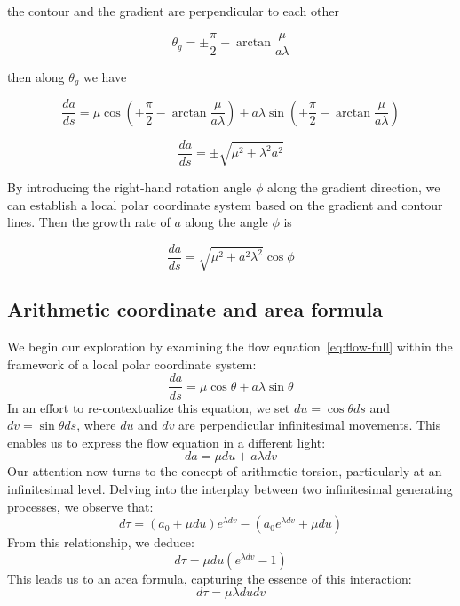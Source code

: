 \documentclass[12pt]{article}
\begin{document}
the contour and the gradient are perpendicular to each other

\begin{equation}
    \theta_g = \pm \frac{\pi}{2} - \arctan \frac{\mu}{a \lambda}\label{eq:gradientangle-full}
\end{equation}

then along $\theta_g$ we have

\begin{equation}
    \frac{da}{ds} = \mu \cos (\pm \frac{\pi}{2} - \arctan \frac{\mu}{a \lambda}) + a \lambda \sin (\pm \frac{\pi}{2} - \arctan \frac{\mu}{a \lambda})
    \label{eq:alonggradient-full}
\end{equation}

\begin{equation}
    \frac{da}{ds} = \pm \sqrt{\mu^2 + \lambda^2 a^2}\label{eq:grad-full}
\end{equation}

By introducing the right-hand rotation angle $\phi$ along the gradient direction, we can establish a local polar coordinate system based on the gradient and contour lines.
Then the growth rate of $a$ along the angle $\phi$ is

\begin{equation}
    \frac{da}{ds} = \sqrt {\mu^2 + a^2 \lambda^2} \cos \phi\label{eq:contourgradient-full}
\end{equation}

\subsection{Arithmetic coordinate and area formula}\label{subsec:descartes-coordinate-full}
We begin our exploration by examining the flow equation~\eqref{eq:flow-full} within the framework of a local polar coordinate system:
\begin{equation}
    \frac{da}{ds} = \mu \cos \theta + a \lambda \sin \theta
\end{equation}
In an effort to re-contextualize this equation, we set $du = \cos \theta ds$ and $dv = \sin \theta ds$,
where $du$ and $dv$ are perpendicular infinitesimal movements.
This enables us to express the flow equation in a different light:
\begin{equation}
    da = \mu du + a \lambda dv
\end{equation}
Our attention now turns to the concept of arithmetic torsion, particularly at an infinitesimal level.
Delving into the interplay between two infinitesimal generating processes, we observe that:
\begin{equation}
    d\tau = (a_0 + \mu du) e^{\lambda dv} - (a_0 e^{\lambda dv} + \mu du)
\end{equation}
From this relationship, we deduce:
\begin{equation}
    d\tau = \mu du (e^{\lambda dv} - 1)
\end{equation}
This leads us to an area formula, capturing the essence of this interaction:
\begin{equation}
    d\tau = \mu \lambda du dv \label{eq:area_formula-full}
\end{equation}
\end{document}

